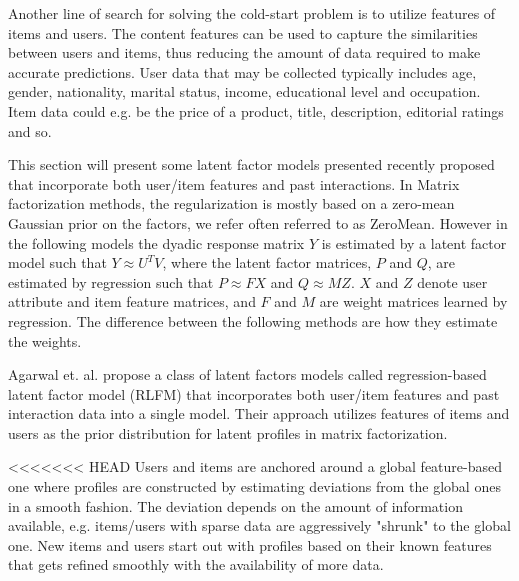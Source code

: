 
Another line of search for solving the cold-start problem is to utilize features of items and users. The content features can be used to capture the similarities between users and items, thus reducing the amount of data required to make accurate predictions. User data that may be collected typically includes age, gender, nationality, marital status, income, educational level and occupation. Item data could e.g. be the price of a product, title, description, editorial ratings and so.


This section will present some latent factor models presented recently proposed that incorporate both user/item features and past interactions. In Matrix factorization methods, the regularization is mostly based on a
zero-mean Gaussian prior on the factors, we refer often referred to as ZeroMean. However in the following models the dyadic response matrix $Y$ is estimated by a latent factor model such that $Y \approx U^{T}V$, where the latent factor matrices, $P$ and $Q$, are estimated by regression such that $P \approx FX$ and $Q \approx MZ$. $X$ and $Z$ denote user attribute and item feature matrices, and $F$ and $M$ are weight matrices learned by regression. The difference between the following methods are how they estimate the weights.


Agarwal et. al. \cite{Agarwal2009} propose a class of latent factors models called regression-based latent factor model (RLFM) that incorporates both user/item features and past interaction data into a single model. Their approach utilizes features of items and users as the
prior distribution for latent profiles in matrix factorization.

<<<<<<< HEAD
Users and items are anchored around a global feature-based one where profiles are constructed by estimating deviations from the global ones in a smooth fashion. The deviation depends on the amount of information available, e.g. items/users with sparse data are aggressively "shrunk" to the global one. New items and users start out with profiles based on their known features that gets refined smoothly with the availability of more data.

